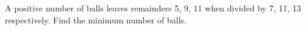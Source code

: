 A positive number of balls leaves remainders 5, 9, 11 when divided by 7, 11, 13 respectively. Find the minimum number of balls.

